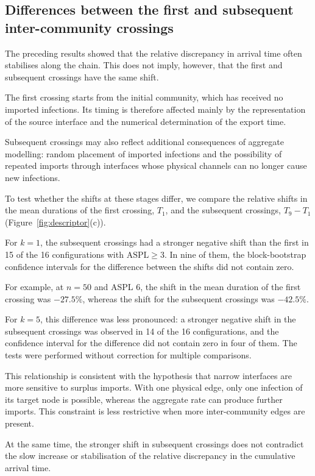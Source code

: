 \subsection{Differences between the first and subsequent inter-community crossings}

The preceding results showed that the relative discrepancy in arrival time often stabilises along the chain. This does not imply, however, that the first and subsequent crossings have the same shift.

The first crossing starts from the initial community, which has received no imported infections. Its timing is therefore affected mainly by the representation of the source interface and the numerical determination of the export time.

Subsequent crossings may also reflect additional consequences of aggregate modelling: random placement of imported infections and the possibility of repeated imports through interfaces whose physical channels can no longer cause new infections.

To test whether the shifts at these stages differ, we compare the relative shifts in the mean durations of the first crossing, $T_1$, and the subsequent crossings, $T_9-T_1$ (Figure~\ref{fig:descriptor}(c)).

For $k=1$, the subsequent crossings had a stronger negative shift than the first in 15 of the 16 configurations with $\mathrm{ASPL}\geq3$. In nine of them, the block-bootstrap confidence intervals for the difference between the shifts did not contain zero.

For example, at $n=50$ and ASPL 6, the shift in the mean duration of the first crossing was $-27.5\%$, whereas the shift for the subsequent crossings was $-42.5\%$.

For $k=5$, this difference was less pronounced: a stronger negative shift in the subsequent crossings was observed in 14 of the 16 configurations, and the confidence interval for the difference did not contain zero in four of them. The tests were performed without correction for multiple comparisons.

This relationship is consistent with the hypothesis that narrow interfaces are more sensitive to surplus imports. With one physical edge, only one infection of its target node is possible, whereas the aggregate rate can produce further imports. This constraint is less restrictive when more inter-community edges are present.

At the same time, the stronger shift in subsequent crossings does not contradict the slow increase or stabilisation of the relative discrepancy in the cumulative arrival time.

